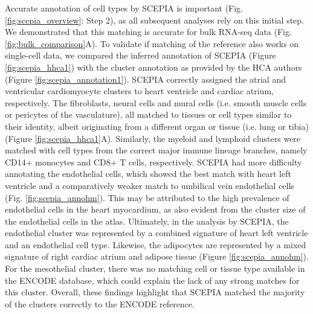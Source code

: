 Accurate annotation of cell types by SCEPIA is important (Fig. \ref{fig:scepia_overview}: Step 2), as all subsequent analyses rely on this initial step. We demonstrated that this matching is accurate for bulk RNA-seq data (Fig. \ref{fig:bulk_comparison}A). To validate if matching of the reference also works on single-cell data, we compared the inferred annotation of SCEPIA (Figure \ref{fig:scepia_hhca1}) with the cluster annotation as provided by the HCA authors (Figure \ref{fig:scepia_annotation1}). SCEPIA correctly assigned the atrial and ventricular cardiomyocyte clusters to heart ventricle and cardiac atrium, respectively. The fibroblasts, neural cells and mural cells (i.e. smooth muscle cells or pericytes of the vasculature), all matched to tissues or cell types similar to their identity, albeit originating from a different organ or tissue (i.e. lung or tibia) (Figure \ref{fig:scepia_hhca1}A). Similarly, the myeloid and lymphoid clusters were matched with cell types from the correct major immune lineage branches, namely CD14+ monocytes and CD8+ T cells, respectively. SCEPIA had more difficulty annotating the endothelial cells, which showed the best match with heart left ventricle and a comparatively weaker match to umbilical vein endothelial cells (Fig. \ref{fig:scepia_annohm}). This may be attributed to the high prevalence of endothelial cells in the heart myocardium, as also evident from the cluster size of the endothelial cells in the atlas. Ultimately, in the analysis by SCEPIA, the endothelial cluster was represented by a combined signature of heart left ventricle and an endothelial cell type. Likewise, the adipocytes are represented by a mixed signature of right cardiac atrium and adipose tissue (Figure \ref{fig:scepia_annohm}). For the mesothelial cluster, there was no matching cell or tissue type available in the ENCODE database, which could explain the lack of any strong matches for this cluster. Overall, these findings highlight that SCEPIA matched the majority of the clusters correctly to the ENCODE reference. 

